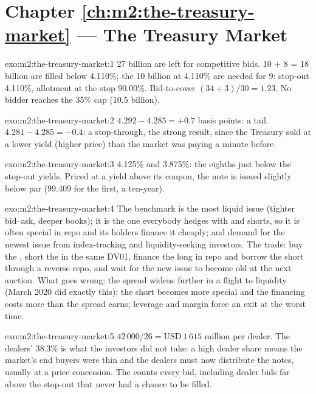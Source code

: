\section*{Chapter \ref{ch:m2:the-treasury-market} --- The Treasury Market}

\begin{solution}{exo:m2:the-treasury-market:1}
27 billion are left for competitive bids. 10 + 8 = 18 billion are filled below
4.110\%; the 10 billion at 4.110\% are needed for 9: stop-out 4.110\%,
allotment at the stop 90.00\%. Bid-to-cover $(34 + 3)/30 = 1.23$. No bidder
reaches the 35\% cap (10.5 billion).
\end{solution}

\begin{solution}{exo:m2:the-treasury-market:2}
$4.292 - 4.285 = +0.7$ basis points: a tail. $4.281 - 4.285 = -0.4$: a stop-through,
the strong result, since the Treasury sold at a lower yield (higher price)
than the market was paying a minute before.
\end{solution}

\begin{solution}{exo:m2:the-treasury-market:3}
4.125\% and 3.875\%: the eighths just below the stop-out yields. Priced at a
yield above its coupon, the note is issued slightly below par (99.409 for the
first, a ten-year).
\end{solution}

\begin{solution}{exo:m2:the-treasury-market:4}
The benchmark is the most liquid issue (tighter bid--ask, deeper books); it is
the one everybody hedges with and shorts, so it is often special in repo and
its holders finance it cheaply; and demand for the newest issue from
index-tracking and liquidity-seeking investors. The trade: buy the ,
short the  in the same DV01, finance the long in repo and borrow the
short through a reverse repo, and wait for the new issue to become old at the
next auction. What goes wrong: the spread widens further in a flight to
liquidity (March 2020 did exactly this); the short becomes more special and the
financing costs more than the spread earns; leverage and margin force an exit
at the worst time.
\end{solution}

\begin{solution}{exo:m2:the-treasury-market:5}
$42\,000/26 = \text{USD}~1\,615$ million per dealer. The dealers' 38.3\% is what
the investors did not take: a high dealer share means the market's end
buyers were thin and the dealers must now distribute the notes, usually at a
price concession. The  counts every bid, including dealer
bids far above the stop-out that never had a chance to be filled.
\end{solution}

